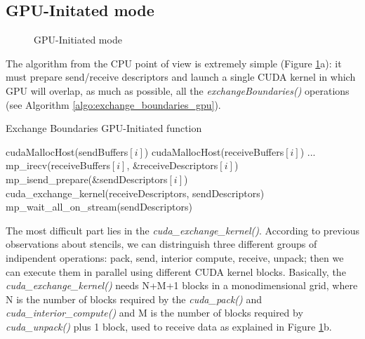 \documentclass[conference]{IEEEtran}
\begin{document}
\subsection{GPU-Initated mode}

\begin{figure}
\hfil
{}
\caption{GPU-Initiated mode}
\label{fig:gpu_initited}
\end{figure}

The algorithm from the CPU point of view is extremely simple (Figure \ref{fig:gpu_initited}a): it must prepare send/receive descriptors and launch a single CUDA kernel in which GPU will overlap, as much as possible, all the \textit{exchangeBoundaries()} operations (see Algorithm \ref{algo:exchange_boundaries_gpu}).

\begin{algorithm}
\small
\caption{Exchange Boundaries GPU-Initiated function}
\label{algo:exchange_boundaries_gpu}
\begin{algorithmic}[1]
\State cudaMallocHost(sendBuffers$[i]$)
\State cudaMallocHost(receiveBuffers$[i]$)
\EndFor
\State ...
		\State mp\_irecv(receiveBuffers$[i]$, \&receiveDescriptors$[i]$)    
	\EndFor
		\State mp\_isend\_prepare(\&sendDescriptors$[i]$)
	\EndFor
	\State cuda\_exchange\_kernel(receiveDescriptors, sendDescriptors)
	\State mp\_wait\_all\_on\_stream(sendDescriptors)
\EndFunction
\end{algorithmic}
\end{algorithm}

The most difficult part lies in the \textit{cuda\_exchange\_kernel()}. According to previous observations about stencils, we can distringuish three different groups of indipendent operations: \lbrack pack, send\rbrack, \lbrack interior compute\rbrack, \lbrack receive, unpack\rbrack; then we can execute them in parallel using different CUDA kernel blocks.
Basically, the \textit{cuda\_exchange\_kernel()} needs N+M+1 blocks in a monodimensional grid, where N is the number of blocks required by the \textit{cuda\_pack()} and \textit{cuda\_interior\_compute()} and M is the number of blocks required by \textit{cuda\_unpack()} plus 1 block, used to receive data as explained in Figure \ref{fig:gpu_initited}b.
\end{document}
